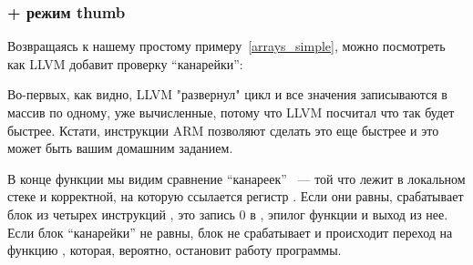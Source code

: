 \subsubsection{\OptimizingXcode + режим thumb}

Возвращаясь к нашему простому примеру~\ref{arrays_simple}, 
можно посмотреть как LLVM добавит проверку ``канарейки'':



Во-первых, как видно, LLVM "развернул" цикл и все значения записываются в массив по одному, уже вычисленные, 
потому что LLVM посчитал что так будет быстрее. Кстати, инструкции ARM позволяют сделать это еще быстрее и это
может быть вашим домашним заданием.

В конце функции мы видим сравнение ``канареек'' ~--- той что лежит в локальном стеке и корректной, на которую
ссылается регистр . Если они равны, срабатывает блок из четырех инструкций , это запись
$0$ в , эпилог функции и выход из нее. Если блок ``канарейки'' не равны, блок не срабатывает и происходит
переход на функцию , которая, вероятно, остановит работу программы.

